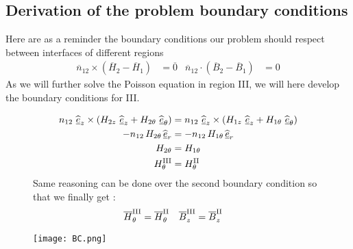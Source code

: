 \subsection*{Derivation of the problem boundary conditions}

Here are as a reminder the boundary conditions our problem should respect between interfaces of different regions
\begin{align*}
\overline{n}_{12} \times \left( \overline{H}_2 - \overline{H}_1 \right) &= \overline{0} &
\overline{n}_{12} \cdot \left( \overline{B}_2 - \overline{B}_1 \right) &= 0 
\end{align*}
As we will further solve the Poisson equation in region \rm III, we will here develop the boundary conditions for \rm III.
\begin{figure}[H]
    \centering
    \begin{minipage}[b]{0.58\linewidth}
        \begin{align*} 
        n_{12}\ \widehat{\underline{e}}_z \times \left( H_{2z}\ \widehat{\underline{e}}_z + H_{2\theta}\ \widehat{\underline{e}}_{\theta} \right) &=  n_{12}\ \widehat{\underline{e}}_z \times \left( H_{1z}\ \widehat{\underline{e}}_z + H_{1\theta}\ \widehat{\underline{e}}_{\theta} \right) \\ -n_{12}\, H_{2\theta}\, \widehat{\underline{e}}_r &= -n_{12}\, H_{1\theta}\, \widehat{\underline{e}}_r \\ 
        H_{2\theta} &= H_{1\theta} \\
        H_{\theta}^{\rm III} &= H_{\theta}^{\rm II }
\end{align*}
Same reasoning can be done over the second boundary condition so that we finally get :
\begin{align}
\label{eq:BC1}
\overline{H}_{\theta}^{\rm III} &= \overline{H}_{\theta}^{\rm II} &
\overline{B}_z^{\rm III} &= \overline{B}_z^{\rm II} 
\end{align}
    \end{minipage}%
    \begin{minipage}[b]{0.4\linewidth}
    \flushright
    \texttt{[image: BC.png]}
    \end{minipage}
\end{figure}

